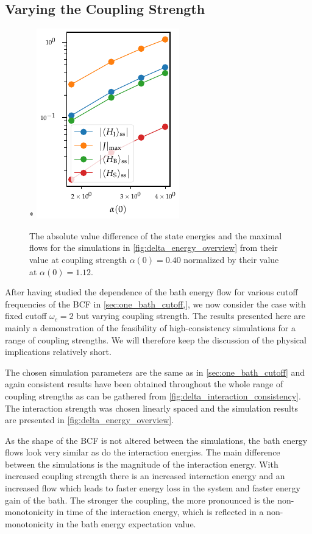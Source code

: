 \subsection{Varying the Coupling Strength}%
\label{sec:one_bathcoup_strength}
\begin{figure}*
  \centering
  \includegraphics{figs/one_bath_syst/final_states_flows}
  \caption{\label{fig:delta_fs_flow} The absolute value difference of
    the state energies and the maximal flows for the simulations in
    \cref{fig:delta_energy_overview} from their value at coupling
    strength \(α(0)=0.40\) normalized by their value at
    \(α(0)=1.12\).}
\end{figure}
After having studied the dependence of the bath energy flow for
various cutoff frequencies of the BCF in \cref{sec:one_bath_cutoff,},
we now consider the case with fixed cutoff \(ω_c=2\) but varying
coupling strength. The results presented here are mainly a
demonstration of the feasibility of high-consistency simulations for a
range of coupling strengths. We will therefore keep the discussion of
the physical implications relatively short.

The chosen simulation parameters are the same as in
\cref{sec:one_bath_cutoff} and again consistent results have been
obtained throughout the whole range of coupling strengths as can be
gathered from \cref{fig:delta_interaction_consistency}.  The
interaction strength was chosen linearly spaced and the simulation
results are presented in \cref{fig:delta_energy_overview}.

As the shape of the BCF is not altered between the simulations, the
bath energy flows look very similar as do the interaction
energies. The main difference between the simulations is the magnitude
of the interaction energy. With increased coupling strength there is
an increased interaction energy and an increased flow which leads to
faster energy loss in the system and faster energy gain of the
bath. The stronger the coupling, the more pronounced is the
non-monotonicity in time of the interaction energy, which is reflected
in a non-monotonicity in the bath energy expectation value.

